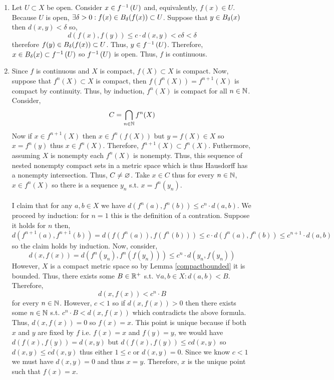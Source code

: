 \documentclass[12pt]{extarticle}
\begin{document}
\begin{enumerate}
\item Let $U \subset X$ be open. Consider $x \in f^{-1} \left( U \right)$ and, equivalently, $f(x) \in U$. Because $U$ is open, $\exists \delta > 0 : f(x) \in B_{\delta} \! \left(f(x) \right) \subset U$. Suppose that $y \in B_{\delta} \! \left(x \right)$ then $d(x, y) < \delta$ so, 
\[d(f(x), f(y)) \le c \cdot d(x,y) < c \delta < \delta\] 
therefore $f(y) \in B_{\delta} \! \left(f(x) \right) \subset U$. Thus, $y \in f^{-1} \left( U \right)$. Therefore, $x \in B_{\delta} \! \left(x \right) \subset f^{-1} \left( U \right)$ so $f^{-1} \left( U \right)$ is open. Thus, $f$ is continuous. 

\item Since $f$ is continuous and $X$ is compact, $f(X) \subset X$ is compact. Now, suppose that $f^n(X) \subset X$ is compact, then $f(f^{n}(X)) = f^{n+1}(X)$ is compact by continuity. Thus, by induction, $f^{n}(X)$ is compact for all $n \in \mathbb{N}$. Consider,
\[C = \bigcap_{n \in \mathbb{N}} f^{n}(X)\]  
Now if $x \in f^{n+1}(X)$ then $x \in f^{n}(f(X))$ but $y = f(X) \in X$ so $x = f^{n}(y)$ thus $x \in f^{n}(X)$. Therefore, $f^{n+1}(X) \subset f^{n}(X)$. Futhermore, assuming $X$ is nonempty each $f^{n}(X)$ is nonempty. Thus, this sequence of nested nonempty compact sets in a metric space which is thus Hausdorff has a nonempty intersection. Thus, $C \neq \varnothing$. Take $x \in C$ thus for every $n \in \mathbb{N}$, $x \in f^{n}(X)$ so there is a sequence $y_n$ s.t. $x = f^{n}(y_n)$. \\\\
I claim that for any $a,b \in X$ we have $d(f^{n}(a), f^{n}(b)) \le c^n \cdot d(a, b)$. We proceed by induction: for $n = 1$ this is the definition of a contration. Suppose it holds for $n$ then, \[d(f^{n+1}(a), f^{n+1}(b)) = d(f(f^{n}(a)), f(f^{n}(b))) \le c \cdot d(f^{n}(a), f^{n}(b)) \le c^{n+1} \cdot d(a, b)\]
so the claim holds by induction. 
Now, consider, \[d(x, f(x)) = d(f^{n}(y_n), f^{n}(f(y_n))) \le c^n \cdot d(y_n, f(y_n))\]   
However, $X$ is a compact metric space so by Lemma \ref{compactbounded} it is bounded. Thus, there exists some $B \in \mathbb{R}^+$ s.t. $\forall a, b \in X : d(a, b) < B$. Therefore, 
\[d(x, f(x)) < c^n \cdot B\]
for every $n \in \mathbb{N}$. However, $c < 1$ so if $d(x , f(x)) > 0$ then there exists some $n \in \mathbb{N}$ s.t. $c^n \cdot B < d(x, f(x))$ which contradicts the above formula. Thus, $d(x, f(x)) = 0$ so $f(x) = x$. This point is unique because if both $x$ and $y$ are fixed by $f$ i.e. $f(x) = x$ and $f(y) = y$, we would have $d(f(x), f(y)) = d(x, y)$ but $d(f(x), f(y)) \le c d(x,y)$ so $d(x, y) \le c \dot d(x,y)$ thus either $1 \le c$ or $d(x, y) = 0$. Since we know $c < 1$ we must have $d(x, y) = 0$ and thus $x = y$. Therefore, $x$ is the unique point such that $f(x) = x$.  
\end{enumerate} 
\end{document}

